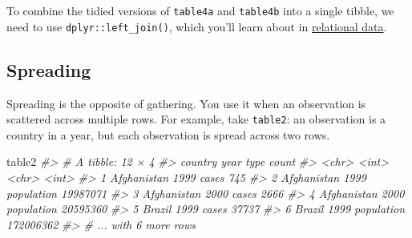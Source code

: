 \documentclass[]{book}
\newenvironment{Shaded}{\begin{snugshade}}{\end{snugshade}}
\newcommand{\KeywordTok}[1]{\textcolor[rgb]{0.13,0.29,0.53}{\textbf{{#1}}}}
\newcommand{\DataTypeTok}[1]{\textcolor[rgb]{0.13,0.29,0.53}{{#1}}}
\newcommand{\StringTok}[1]{\textcolor[rgb]{0.31,0.60,0.02}{{#1}}}
\newcommand{\CommentTok}[1]{\textcolor[rgb]{0.56,0.35,0.01}{\textit{{#1}}}}
\newcommand{\NormalTok}[1]{{#1}}
\begin{document}
To combine the tidied versions of \texttt{table4a} and \texttt{table4b}
into a single tibble, we need to use \texttt{dplyr::left\_join()}, which
you'll learn about in \protect\hyperlink{relational-data}{relational
data}.

\begin{Shaded}
\end{Shaded}

\subsection{Spreading}\label{spreading}

Spreading is the opposite of gathering. You use it when an observation
is scattered across multiple rows. For example, take \texttt{table2}: an
observation is a country in a year, but each observation is spread
across two rows.

\begin{Shaded}
\begin{Highlighting}[]
\NormalTok{table2}
\CommentTok{#> # A tibble: 12 × 4}
\CommentTok{#>       country  year       type     count}
\CommentTok{#>         <chr> <int>      <chr>     <int>}
\CommentTok{#> 1 Afghanistan  1999      cases       745}
\CommentTok{#> 2 Afghanistan  1999 population  19987071}
\CommentTok{#> 3 Afghanistan  2000      cases      2666}
\CommentTok{#> 4 Afghanistan  2000 population  20595360}
\CommentTok{#> 5      Brazil  1999      cases     37737}
\CommentTok{#> 6      Brazil  1999 population 172006362}
\CommentTok{#> # ... with 6 more rows}
\end{Highlighting}
\end{Shaded}
\end{document}
